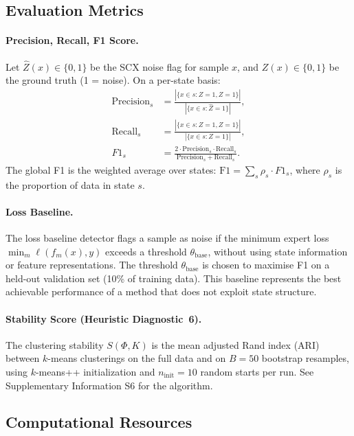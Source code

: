 \subsection{Evaluation Metrics}

\paragraph{Precision, Recall, F1 Score.}
Let $\hat{Z}(x) \in \{0,1\}$ be the SCX noise flag for sample $x$, and $Z(x) \in \{0,1\}$ be the ground truth (1 = noise). On a per-state basis:
\begin{align}
\text{Precision}_s &= \frac{|\{x \in s: \hat{Z}=1, Z=1\}|}{|\{x \in s: \hat{Z}=1\}|}, \\
\text{Recall}_s &= \frac{|\{x \in s: \hat{Z}=1, Z=1\}|}{|\{x \in s: Z=1\}|}, \\
F1_s &= \frac{2 \cdot \text{Precision}_s \cdot \text{Recall}_s}{\text{Precision}_s + \text{Recall}_s}.
\end{align}
The global F1 is the weighted average over states: $\mathrm{F1} = \sum_s \rho_s \cdot F1_s$, where $\rho_s$ is the proportion of data in state $s$.

\paragraph{Loss Baseline.}
The loss baseline detector flags a sample as noise if the minimum expert loss $\min_m \ell(f_m(x), y)$ exceeds a threshold $\theta_{\text{base}}$, without using state information or feature representations. The threshold $\theta_{\text{base}}$ is chosen to maximise F1 on a held-out validation set (10\% of training data). This baseline represents the best achievable performance of a method that does not exploit state structure.

\paragraph{Stability Score (Heuristic Diagnostic~6).}
The clustering stability $S(\Phi, K)$ is the mean adjusted Rand index (ARI) between $k$-means clusterings on the full data and on $B = 50$ bootstrap resamples, using $k$-means++ initialization and $n_{\text{init}} = 10$ random starts per run. See Supplementary Information S6 for the algorithm.

\subsection{Computational Resources}
\label{sec:compute}

